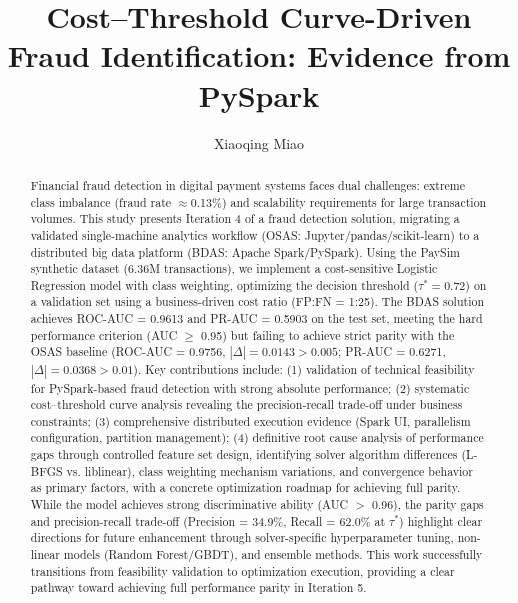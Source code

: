 \documentclass[sigplan,screen]{acmart}
\begin{document}
\title[Cost-Driven Fraud Detection with PySpark]{Cost--Threshold Curve-Driven Fraud Identification: Evidence from PySpark}

\author{Xiaoqing Miao}

\begin{abstract}
  Financial fraud detection in digital payment systems faces dual challenges: extreme class imbalance (fraud rate $\approx$0.13\%) and scalability requirements for large transaction volumes. This study presents Iteration 4 of a fraud detection solution, migrating a validated single-machine analytics workflow (OSAS: Jupyter/pandas/scikit-learn) to a distributed big data platform (BDAS: Apache Spark/PySpark). Using the PaySim synthetic dataset (6.36M transactions), we implement a cost-sensitive Logistic Regression model with class weighting, optimizing the decision threshold ($\tau^* = 0.72$) on a validation set using a business-driven cost ratio (FP:FN = 1:25). The BDAS solution achieves ROC-AUC = 0.9613 and PR-AUC = 0.5903 on the test set, meeting the hard performance criterion (AUC $\geq$ 0.95) but failing to achieve strict parity with the OSAS baseline (ROC-AUC = 0.9756, $|\Delta| = 0.0143 > 0.005$; PR-AUC = 0.6271, $|\Delta| = 0.0368 > 0.01$). Key contributions include: (1) validation of technical feasibility for PySpark-based fraud detection with strong absolute performance; (2) systematic cost--threshold curve analysis revealing the precision-recall trade-off under business constraints; (3) comprehensive distributed execution evidence (Spark UI, parallelism configuration, partition management); (4) definitive root cause analysis of performance gaps through controlled feature set design, identifying solver algorithm differences (L-BFGS vs. liblinear), class weighting mechanism variations, and convergence behavior as primary factors, with a concrete optimization roadmap for achieving full parity. While the model achieves strong discriminative ability (AUC $>$ 0.96), the parity gaps and precision-recall trade-off (Precision = 34.9\%, Recall = 62.0\% at $\tau^*$) highlight clear directions for future enhancement through solver-specific hyperparameter tuning, non-linear models (Random Forest/GBDT), and ensemble methods. This work successfully transitions from feasibility validation to optimization execution, providing a clear pathway toward achieving full performance parity in Iteration 5.
\end{abstract}
\end{document}
